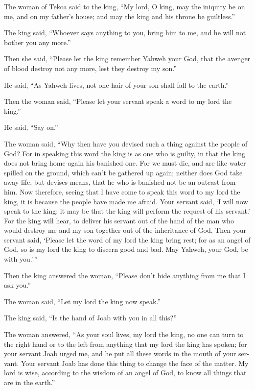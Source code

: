 \begin{paracol}{2}
\begin{otherlanguage}{english}
 The woman of Tekoa said to the king, ``My lord, O king,
may the iniquity be on me, and on my father's house; and may the king
and his throne be guiltless.''

 The king said, ``Whoever says anything to you, bring him
to me, and he will not bother you any more.''

 Then she said, ``Please let the king remember Yahweh
your God, that the avenger of blood destroy not any more, lest they
destroy my son.''

He said, ``As Yahweh lives, not one hair of your son shall fall to the
earth.''

 Then the woman said, ``Please let your servant speak a
word to my lord the king.''

He said, ``Say on.''

 The woman said, ``Why then have you devised such a thing
against the people of God? For in speaking this word the king is as one
who is guilty, in that the king does not bring home again his banished
one.  For we must die, and are like water spilled on the
ground, which can't be gathered up again; neither does God take away
life, but devises means, that he who is banished not be an outcast from
him.  Now therefore, seeing that I have come to speak
this word to my lord the king, it is because the people have made me
afraid. Your servant said, `I will now speak to the king; it may be that
the king will perform the request of his servant.'  For
the king will hear, to deliver his servant out of the hand of the man
who would destroy me and my son together out of the inheritance of God.
 Then your servant said, `Please let the word of my lord
the king bring rest; for as an angel of God, so is my lord the king to
discern good and bad. May Yahweh, your God, be with you.'\,''

 Then the king answered the woman, ``Please don't hide
anything from me that I ask you.''

The woman said, ``Let my lord the king now speak.''

 The king said, ``Is the hand of Joab with you in all
this?''

The woman answered, ``As your soul lives, my lord the king, no one can
turn to the right hand or to the left from anything that my lord the
king has spoken; for your servant Joab urged me, and he put all these
words in the mouth of your servant.  Your servant Joab
has done this thing to change the face of the matter. My lord is wise,
according to the wisdom of an angel of God, to know all things that are
in the earth.''


\end{otherlanguage}
\end{paracol}
